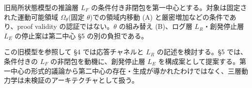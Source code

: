 旧局所状態模型の推論層 $L_F$ の条件付き非閉包を第一中心とする。対象は固定された運動可能領域 $\Omega_\theta$(固定 $\theta$)での領域内移動 (A) と厳密増加などの条件であり、proof validity の認証ではない。$\theta$ の組み替え (B)、ログ層 $L_R$・創発停止層 $L_E$ の停止案は第二中心 \S{}5 の別の負担である。

この旧模型を参照して \S{}4 では応答チャネルと $L_R$ の記述を検討する。\S{}5 では、条件付きの $L_F$ の非閉包を動機に、創発停止層 $L_E$ を構成案として提案する。第一中心の形式的議論から第二中心の存在・生成が導かれたわけではなく、三層動力学は未検証のアーキテクチャとして扱う。

\bigskip
